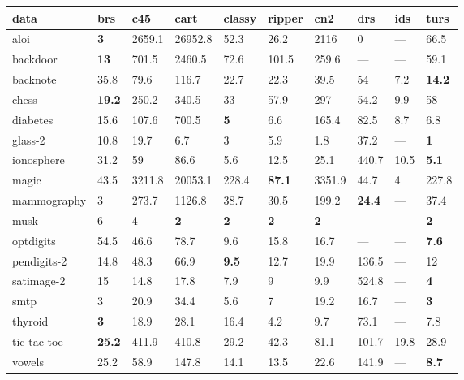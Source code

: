\begin{table}[ht]
\centering
\begin{tabular}{l|llllllll|l}
  \hline
data & brs & c45 & cart & classy & ripper & cn2 & drs & ids & turs \\ 
  \hline
aloi & \textbf{3} & \tiny{2659.1} & 26952.8 & 52.3 & \tiny{26.2} & 2116 & \tiny{0} & --- & 66.5 \\ 
  backdoor & \textbf{13} & 701.5 & 2460.5 & 72.6 & 101.5 & 259.6 & --- & --- & 59.1 \\ 
  backnote & 35.8 & 79.6 & 116.7 & 22.7 & 22.3 & 39.5 & 54 & \tiny{7.2} & \textbf{14.2} \\ 
  chess & \textbf{19.2} & 250.2 & 340.5 & 33 & 57.9 & \tiny{297} & \tiny{54.2} & \tiny{9.9} & 58 \\ 
  diabetes & 15.6 & 107.6 & 700.5 & \textbf{5} & \tiny{6.6} & 165.4 & 82.5 & \tiny{8.7} & 6.8 \\ 
  glass-2 & \tiny{10.8} & 19.7 & \tiny{6.7} & \tiny{3} & \tiny{5.9} & 1.8 & 37.2 & --- & \textbf{1} \\ 
  ionosphere & \tiny{31.2} & 59 & 86.6 & 5.6 & 12.5 & 25.1 & \tiny{440.7} & \tiny{10.5} & \textbf{5.1} \\ 
  magic & \tiny{43.5} & 3211.8 & 20053.1 & 228.4 & \textbf{87.1} & \tiny{3351.9} & \tiny{44.7} & \tiny{4} & 227.8 \\ 
  mammography & \tiny{3} & 273.7 & \tiny{1126.8} & 38.7 & \tiny{30.5} & 199.2 & \textbf{24.4} & --- & 37.4 \\ 
  musk & 6 & 4 & \textbf{2} & \textbf{2} & \textbf{2} & \textbf{2} & --- & --- & \textbf{2} \\ 
  optdigits & 54.5 & 46.6 & 78.7 & 9.6 & 15.8 & 16.7 & --- & --- & \textbf{7.6} \\ 
  pendigits-2 & 14.8 & 48.3 & 66.9 & \textbf{9.5} & 12.7 & 19.9 & 136.5 & --- & 12 \\ 
  satimage-2 & 15 & 14.8 & 17.8 & 7.9 & 9 & 9.9 & \tiny{524.8} & --- & \textbf{4} \\ 
  smtp & \tiny{3} & 20.9 & 34.4 & 5.6 & 7 & \tiny{19.2} & 16.7 & --- & \textbf{3} \\ 
  thyroid & \textbf{3} & 18.9 & 28.1 & 16.4 & 4.2 & 9.7 & 73.1 & --- & 7.8 \\ 
  tic-tac-toe & \textbf{25.2} & 411.9 & 410.8 & 29.2 & 42.3 & 81.1 & 101.7 & \tiny{19.8} & 28.9 \\ 
  vowels & 25.2 & \tiny{58.9} & 147.8 & 14.1 & 13.5 & 22.6 & 141.9 & --- & \textbf{8.7} \\ 

\end{tabular}
\end{table}
